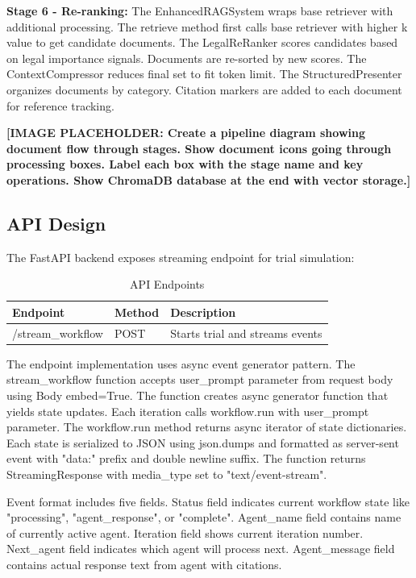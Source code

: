 \documentclass[12pt,singleside,a4paper]{article}
\begin{document}
\textbf{Stage 6 - Re-ranking:} The EnhancedRAGSystem wraps base retriever with additional processing. The retrieve method first calls base retriever with higher k value to get candidate documents. The LegalReRanker scores candidates based on legal importance signals. Documents are re-sorted by new scores. The ContextCompressor reduces final set to fit token limit. The StructuredPresenter organizes documents by category. Citation markers are added to each document for reference tracking.

\textbf{[IMAGE PLACEHOLDER: Create a pipeline diagram showing document flow through stages. Show document icons going through processing boxes. Label each box with the stage name and key operations. Show ChromaDB database at the end with vector storage.]}

\subsection{API Design}
The FastAPI backend exposes streaming endpoint for trial simulation:

\begin{table}[h]
\centering
\begin{tabular}{|l|l|l|}
\hline
\textbf{Endpoint} & \textbf{Method} & \textbf{Description} \\
\hline
/stream\_workflow & POST & Starts trial and streams events \\
\hline
\end{tabular}
\caption{API Endpoints}
\end{table}

The endpoint implementation uses async event generator pattern. The stream\_workflow function accepts user\_prompt parameter from request body using Body embed=True. The function creates async generator function that yields state updates. Each iteration calls workflow.run with user\_prompt parameter. The workflow.run method returns async iterator of state dictionaries. Each state is serialized to JSON using json.dumps and formatted as server-sent event with "data:" prefix and double newline suffix. The function returns StreamingResponse with media\_type set to "text/event-stream".

Event format includes five fields. Status field indicates current workflow state like "processing", "agent\_response", or "complete". Agent\_name field contains name of currently active agent. Iteration field shows current iteration number. Next\_agent field indicates which agent will process next. Agent\_message field contains actual response text from agent with citations.
\end{document}
